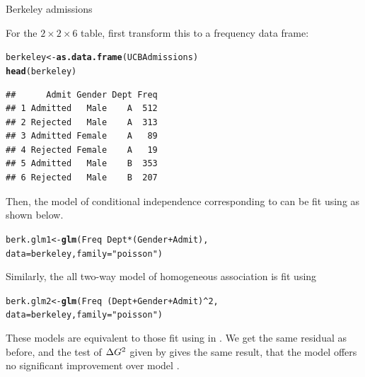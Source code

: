 \documentclass[11pt]{book}\usepackage[]{graphicx}\usepackage[]{color}
\makeatletter
\newcommand{\hlnum}[1]{\textcolor[rgb]{0.686,0.059,0.569}{#1}}%
\newcommand{\hlstr}[1]{\textcolor[rgb]{0.192,0.494,0.8}{#1}}%
\newcommand{\hlopt}[1]{\textcolor[rgb]{0,0,0}{#1}}%
\newcommand{\hlstd}[1]{\textcolor[rgb]{0.345,0.345,0.345}{#1}}%
\newcommand{\hlkwb}[1]{\textcolor[rgb]{0.69,0.353,0.396}{#1}}%
\newcommand{\hlkwc}[1]{\textcolor[rgb]{0.333,0.667,0.333}{#1}}%
\newcommand{\hlkwd}[1]{\textcolor[rgb]{0.737,0.353,0.396}{\textbf{#1}}}%
\newenvironment{kframe}{%
 \def\at@end@of@kframe{}%
 \ifinner\ifhmode%
  \def\at@end@of@kframe{\end{minipage}}%
  \begin{minipage}{\columnwidth}%
 \fi\fi%
 \def\FrameCommand##1{\hskip\@totalleftmargin \hskip-\fboxsep
 \colorbox{shadecolor}{##1}\hskip-\fboxsep
     \hskip-\linewidth \hskip-\@totalleftmargin \hskip\columnwidth}%
 \MakeFramed {\advance\hsize-\width
   \@totalleftmargin\z@ \linewidth\hsize
   \@setminipage}}%
 {\par\unskip\endMakeFramed%
 \at@end@of@kframe}
\newenvironment{knitrout}{}{} %
\renewenvironment{knitrout}{\small\renewcommand{\baselinestretch}{.85}}{} %
\makeatother
\begin{document}
\begin{Example}[berkeley6]{Berkeley admissions}

For the $2 \times 2 \times 6$  table,
first transform this to a frequency data frame:
\begin{knitrout}
\color{fgcolor}\begin{kframe}
\begin{alltt}
\hlstd{berkeley} \hlkwb{<-} \hlkwd{as.data.frame}\hlstd{(UCBAdmissions)}
\hlkwd{head}\hlstd{(berkeley)}
\end{alltt}
\begin{verbatim}
##      Admit Gender Dept Freq
## 1 Admitted   Male    A  512
## 2 Rejected   Male    A  313
## 3 Admitted Female    A   89
## 4 Rejected Female    A   19
## 5 Admitted   Male    B  353
## 6 Rejected   Male    B  207
\end{verbatim}
\end{kframe}
\end{knitrout}

Then, the model of conditional independence
corresponding to  can be fit using 
as shown below.
\begin{knitrout}
\color{fgcolor}\begin{kframe}
\begin{alltt}
\hlstd{berk.glm1} \hlkwb{<-} \hlkwd{glm}\hlstd{(Freq} \hlopt{~} \hlstd{Dept} \hlopt{*} \hlstd{(Gender}\hlopt{+}\hlstd{Admit),}
                 \hlkwc{data}\hlstd{=berkeley,} \hlkwc{family}\hlstd{=}\hlstr{"poisson"}\hlstd{)}
\end{alltt}
\end{kframe}
\end{knitrout}
Similarly, the all two-way model of homogeneous association is fit using
\begin{knitrout}
\color{fgcolor}\begin{kframe}
\begin{alltt}
\hlstd{berk.glm2} \hlkwb{<-} \hlkwd{glm}\hlstd{(Freq} \hlopt{~} \hlstd{(Dept} \hlopt{+} \hlstd{Gender} \hlopt{+} \hlstd{Admit)}\hlopt{^}\hlnum{2}\hlstd{,}
                 \hlkwc{data}\hlstd{=berkeley,} \hlkwc{family}\hlstd{=}\hlstr{"poisson"}\hlstd{)}
\end{alltt}
\end{kframe}
\end{knitrout}
These models are equivalent to those fit using  in .
We get the same residual \GSQ as before, and the \LR test of $\Delta G^2$ given
by  gives the same result, that the model 
offers no significant improvement over model .


\end{Example}
\end{document}
